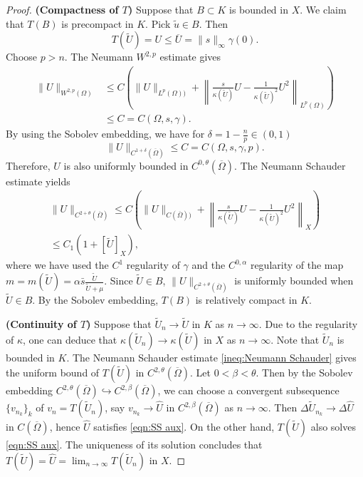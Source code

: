 \documentclass{article}
\begin{document}
\begin{proof}
    \textbf{(Compactness of $T$)} Suppose that $B\subset K$ is bounded in $X$.
    We claim that $T(B)$ is precompact in $K$. Pick $\tilde u\in B$. Then $$T(\tilde U) =U \le \overline{U}=\|s\|_\infty\gamma(0).$$ Choose $p>n$. The Neumann $W^{2,p}$ estimate gives
    \begin{align*}
        \|U\|_{W^{2,p}(\Omega)}&\le C\left(\|U\|_{L^{p}(\Omega))}+\left\|\frac{s}{\kappa(\tilde U)} U - \frac{1}{\kappa(\tilde U)^2}U^2\right\|_{L^{p}(\Omega)}\right)\\
        &\le C=C(\Omega, s,\gamma).
    \end{align*}  By using the Sobolev embedding, we have for $\delta=1-\frac{n}{p}\in (0,1)$ 
    \[\|U\|_{C^{1+\delta}(\overline\Omega)}\le C=C(\Omega,s,\gamma,p). \] Therefore, $U$ is also uniformly bounded in $C^{0,\theta}(\overline{\Omega})$. 
    The Neumann Schauder estimate yields
    \begin{align}\label{ineq:Neumann Schauder}
        \|U\|_{C^{2+\theta}(\overline \Omega)}\le C\left(\|U\|_{C(\overline\Omega))}+\left\|\frac{s}{\kappa(\tilde U)} U - \frac{1}{\kappa(\tilde U)^2}U^2\right\|_{X}\right)\\
        \le C_1(1+[\tilde U]_{X}),
    \end{align} where we have used the $C^1$ regularity of $\gamma$ and the $C^{0,\alpha}$ regularity of the map  $m=m(\tilde U) = \alpha\bar s \frac{\tilde U}{\tilde U+\mu}$. Since $\tilde U\in B$, $\|U\|_{C^{2+\theta}(\overline \Omega)}$ is uniformly bounded when $\tilde U\in B$. By the Sobolev embedding, $T(B)$ is relatively compact in $K$. 
    
    \textbf{(Continuity of $T$)} Suppose that $\tilde U_n\to \tilde U$ in $K$ as $n\to\infty$. Due to the regularity of $\kappa$, one can deduce that $\kappa(\tilde U_n)\to\kappa(\tilde U)$ in $X$ as $n\to\infty$. Note that $\tilde U_n$ is bounded in $K$. The Neumann Schauder estimate \eqref{ineq:Neumann Schauder} gives the uniform bound of $T(\tilde U)$ in $C^{2,\theta}(\overline{\Omega})$. Let $0<\beta <\theta$. Then by the Sobolev embedding $C^{2,\theta}(\overline{\Omega})\hookrightarrow C^{2,\beta}(\overline{\Omega})$, we can choose a convergent subsequence $\{v_{n_k}\}_k$ of $v_{n} = T(\tilde U_n)$, say $v_{n_k}\to \hat U$ in $C^{2,\beta}(\overline{\Omega})$ as $n\to \infty$. Then $\Delta \tilde U_{n_k}\to \Delta \hat U$ in $C(\overline{\Omega})$, hence
    $\hat U$ satisfies \eqref{eqn:SS aux}. On the other hand, $T(\tilde U)$ also solves \eqref{eqn:SS aux}. The uniqueness of its solution concludes that $T(\tilde U)=\hat U=\lim_{n\to\infty}T(\tilde U_n)$ in $X$.


\end{proof}
\end{document}
